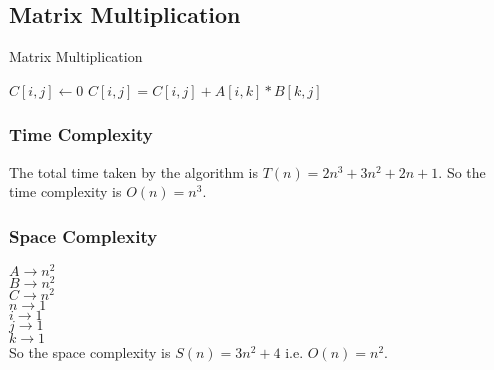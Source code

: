 \documentclass[twocolumn]{article}
\begin{document}
\subsection{Matrix Multiplication}
\noindent
\begin{algorithm}
    \caption{Matrix Multiplication}\label{matmul}
    \begin{algorithmic}
             
                 
                    \State $C[i, j] \gets 0$ 
                     
                        \State$C[i, j] = C[i, j] + A[i, k] * B[k, j]$ 
                    \EndFor
                \EndFor
            \EndFor
        \EndProcedure
    \end{algorithmic}
\end{algorithm}

\subsubsection{Time Complexity}
\noindent
The total time taken by the algorithm is $T(n) = 2n^3 + 3n^2 + 2n + 1$. So the time complexity is $O(n) = n^3$.

\subsubsection{Space Complexity}
\noindent
$A \rightarrow n^2$ \\
$B \rightarrow n^2$ \\
$C \rightarrow n^2$ \\
$n \rightarrow 1$ \\
$i \rightarrow 1$ \\
$j \rightarrow 1$ \\
$k \rightarrow 1$ \\
So the space complexity is $S(n) = 3n^2 + 4$ i.e. $O(n) = n^2$.
\end{document}
